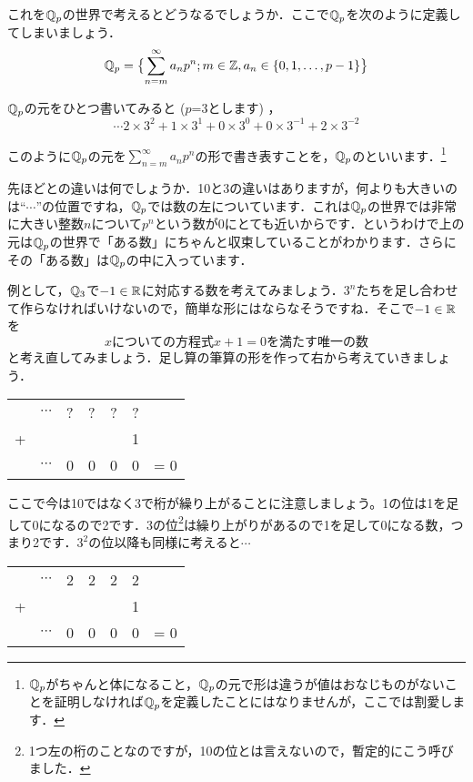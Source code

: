 \documentclass[./main]{subfiles}
\begin{document}
これを$\mathbb{Q}_p$の世界で考えるとどうなるでしょうか．ここで$\mathbb{Q}_p$を次のように定義してしまいましょう．
\[
\mathbb{Q}_p=\bigl\{ \sum^\infty_{n=m} a_n p^n ; m\in \mathbb{Z} , a_n \in \{ 0,1,\dotsc ,p-1\} \bigr\}
\]

$\mathbb{Q}_p$の元をひとつ書いてみると ($p$=3とします) ，
\[
\cdots2 \times 3^2 + 1 \times 3^1 + 0 \times 3^0 + 0\times 3^{-1} + 2 \times 3^{-2}
\]

このように$\mathbb{Q}_p$の元を$\sum^\infty_{n=m} a_n p^n$の形で書き表すことを，$\mathbb{Q}_p$のといいます．\footnote{$\mathbb{Q}_p$がちゃんと体になること，$\mathbb{Q}_p$の元で形は違うが値はおなじものがないことを証明しなければ$\mathbb{Q}_p$を定義したことにはなりませんが，ここでは割愛します．}

先ほどとの違いは何でしょうか．10と3の違いはありますが，何よりも大きいのは``$\cdots$''の位置ですね，$\mathbb{Q}_p$では数の左についています．これは$\mathbb{Q}_p$の世界では非常に大きい整数$n$について$p^n$という数が0にとても近いからです．というわけで上の元は$\mathbb{Q}_p$の世界で「ある数」にちゃんと収束していることがわかります．さらにその「ある数」は$\mathbb{Q}_p$の中に入っています．

例として，$\mathbb{Q}_3$で$-1\in\mathbb{R}$に対応する数を考えてみましょう．$3^n$たちを足し合わせて作らなければいけないので，簡単な形にはならなそうですね．そこで$-1\in\mathbb{R}$を
\[
xについての方程式 x+1=0 を満たす唯一の数
\]
と考え直してみましょう．足し算の筆算の形を作って右から考えていきましょう．

\begin{center}
\begin{tabular}{ccccccr}
	 &$\cdots$&?&?&?&?& \\ 
	+& & & & &1& \\ \cline{1-6} 
	 &$\cdots$&0&0&0&0& = 0\\
\end{tabular}
\end{center}

ここで今は10ではなく3で桁が繰り上がることに注意しましょう。1の位は1を足して0になるので2です．3の位\footnote{1つ左の桁のことなのですが，10の位とは言えないので，暫定的にこう呼びました．}は繰り上がりがあるので1を足して0になる数，つまり2です．$3^2$の位以降も同様に考えると$\cdots$

\begin{center}
\begin{tabular}{ccccccr}
	 &$\cdots$&2&2&2&2& \\ 
	+& & & & &1& \\ \cline{1-6} 
	 &$\cdots$&0&0&0&0& = 0\\
\end{tabular}
\end{center}
\end{document}
